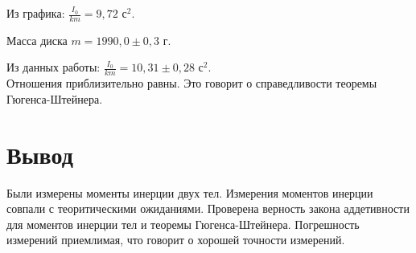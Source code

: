 \documentclass[a4paper]{article}
\begin{document}
    \item Из графика: $\frac{I_0}{km} = 9,72$ с$^2$.
    \item Масса диска $m = 1990,0 \pm{0,3}$ г.
    \item Из данных работы: $\frac{I_0}{km} = 10,31 \pm{0,28}$ с$^2$.\\

    Отношения приблизительно равны. Это говорит о справедливости теоремы Гюгенса-Штейнера.\\



\section{Вывод}

    Были измерены моменты инерции двух тел. Измерения моментов инерции совпали с теоритическими ожиданиями. Проверена верность закона аддетивности для моментов инерции тел и теоремы Гюгенса-Штейнера. Погрешность измерений приемлимая, что говорит о хорошей точности измерений.
\end{document}
